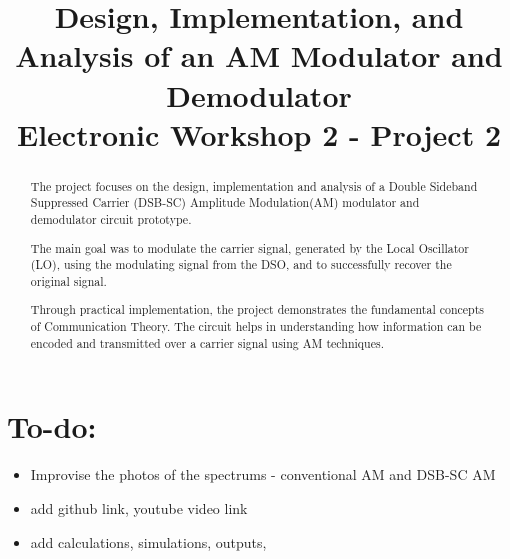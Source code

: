 \documentclass[conference]{IEEEtran}
\begin{document}
\title{Design, Implementation, and Analysis of an AM Modulator and Demodulator\\
{\Large Electronic Workshop 2 - Project 2}
}


\author{
\and
{}
}
\maketitle

\begin{abstract}

The project focuses on the design, implementation and analysis of a Double Sideband Suppressed Carrier (DSB-SC) Amplitude Modulation(AM) modulator and demodulator circuit prototype.

The main goal was to modulate the carrier signal, generated by the Local Oscillator (LO), using the modulating signal from the DSO, and to successfully recover the original signal.

Through practical implementation, the project demonstrates the fundamental concepts of Communication Theory. The circuit helps in understanding how information can be encoded and transmitted over a carrier signal using AM techniques.
\end{abstract}


\section{To-do: }
\begin{itemize}
    \item Improvise the photos of the spectrums - conventional AM and DSB-SC AM
    \item add github link, youtube video link
    \item add calculations, simulations, outputs, 
    
\end{itemize}
\end{document}
